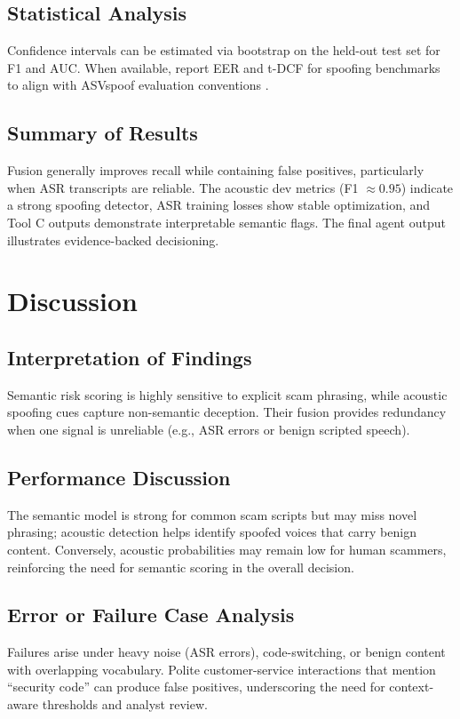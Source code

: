 \documentclass[11pt,a4paper]{article}
\begin{document}
\subsection{Statistical Analysis}
Confidence intervals can be estimated via bootstrap on the held-out test set for F1 and AUC. When available, report EER and t-DCF for spoofing benchmarks to align with ASVspoof evaluation conventions \cite{asvspoof2019}.

\subsection{Summary of Results}
Fusion generally improves recall while containing false positives, particularly when ASR transcripts are reliable. The acoustic dev metrics (F1 $\approx 0.95$) indicate a strong spoofing detector, ASR training losses show stable optimization, and Tool C outputs demonstrate interpretable semantic flags. The final agent output illustrates evidence-backed decisioning.

\section{Discussion}
\subsection{Interpretation of Findings}
Semantic risk scoring is highly sensitive to explicit scam phrasing, while acoustic spoofing cues capture non-semantic deception. Their fusion provides redundancy when one signal is unreliable (e.g., ASR errors or benign scripted speech).

\subsection{Performance Discussion}
The semantic model is strong for common scam scripts but may miss novel phrasing; acoustic detection helps identify spoofed voices that carry benign content. Conversely, acoustic probabilities may remain low for human scammers, reinforcing the need for semantic scoring in the overall decision.

\subsection{Error or Failure Case Analysis}
Failures arise under heavy noise (ASR errors), code-switching, or benign content with overlapping vocabulary. Polite customer-service interactions that mention ``security code'' can produce false positives, underscoring the need for context-aware thresholds and analyst review.
\end{document}
